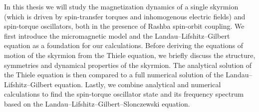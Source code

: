 In this thesis we will study the magnetization dynamics of a single skyrmion (which is driven by spin-transfer torques and inhomogenous electric fields) and spin-torque oscillators, both in the presence of Rashba spin-orbit coupling. We first introduce the micromagnetic model and the Landau--Lifshitz--Gilbert equation as a foundation for our calculations. Before deriving the equations of motion of the skyrmion from the Thiele equation, we briefly discuss the structure, symmetries and dynamical properties of the skyrmion. The analytical solution of the Thiele equation is then compared to a full numerical solution of the Landau--Lifshitz--Gilbert equation. Lastly, we combine analytical and numerical calculations to find the spin-torque oscillator state and its frequency spectrum based on the Landau--Lifshitz--Gilbert--Slonczewski equation. 